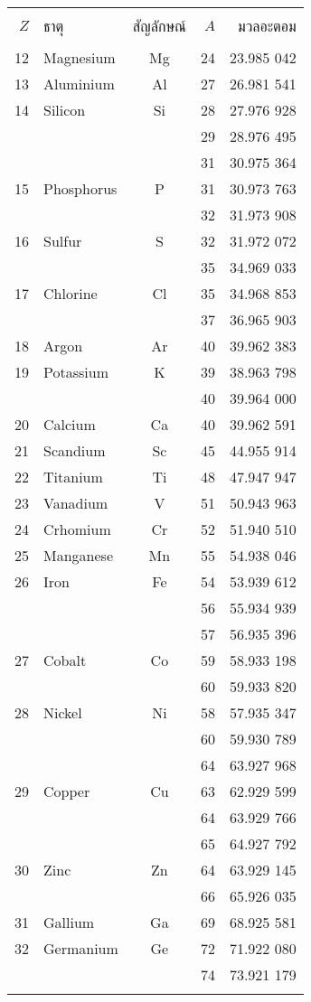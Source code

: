 \begin{tabular}{rlcrr}
\hline\\
$Z$&ธาตุ&สัญลักษณ์&$A$&มวลอะตอม\\
\hline\\
12&Magnesium&Mg&24&23.985 042\\
13&Aluminium&Al&27&26.981 541\\
14&Silicon&Si&28&27.976 928\\
&&&29&28.976 495\\
&&&31&30.975 364\\
15&Phosphorus&P&31&30.973 763\\
&&&32&31.973 908\\
16&Sulfur&S&32&31.972 072\\
&&&35&34.969 033\\
17&Chlorine&Cl&35&34.968 853\\
&&&37&36.965 903\\
18&Argon&Ar&40&39.962 383\\
19&Potassium&K&39&38.963 798\\
&&&40&39.964 000\\
20&Calcium&Ca&40&39.962 591\\
21&Scandium&Sc&45&44.955 914\\
22&Titanium&Ti&48&47.947 947\\
23&Vanadium&V&51&50.943 963\\
24&Crhomium&Cr&52&51.940 510\\
25&Manganese&Mn&55&54.938 046\\
26&Iron&Fe&54&53.939 612\\
&&&56&55.934 939\\
&&&57&56.935 396\\
27&Cobalt&Co&59&58.933 198\\
&&&60&59.933 820\\
28&Nickel&Ni&58&57.935 347\\
&&&60&59.930 789\\
&&&64&63.927 968\\
29&Copper&Cu&63&62.929 599\\
&&&64&63.929 766\\
&&&65&64.927 792\\
30&Zinc&Zn&64&63.929 145\\
&&&66&65.926 035\\
31&Gallium&Ga&69&68.925 581\\
32&Germanium&Ge&72&71.922 080\\
&&&74&73.921 179\\\\
\hline
\end{tabular}


